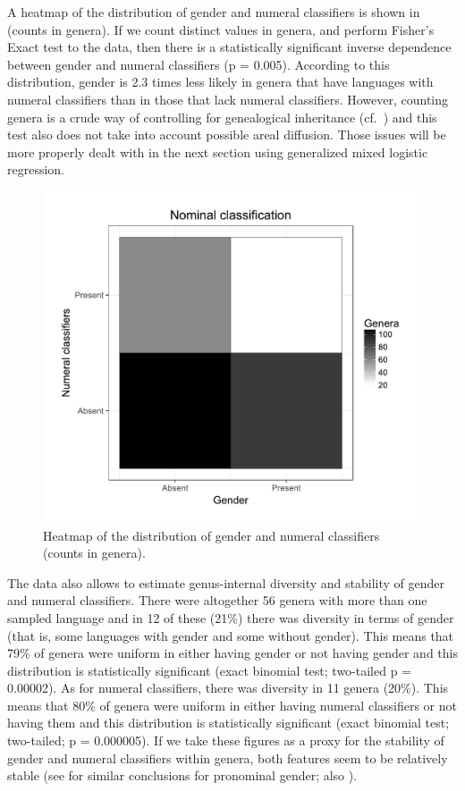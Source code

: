 \documentclass[output=collectionpaper]{langsci/langscibook}
\begin{document}
\newpage 
A heatmap of the distribution of gender and numeral classifiers is shown in  (counts in genera). If we count distinct values in genera, and perform Fisher's Exact test to the data, then there is a statistically significant inverse dependence between gender and numeral classifiers (p = 0.005). According to this distribution, gender is 2.3 times less likely in genera that have languages with numeral classifiers than in those that lack numeral classifiers. However, counting genera is a crude way of controlling for genealogical inheritance (cf.\ ) and this test also does not take into account possible areal diffusion. Those issues will be more properly dealt with in the next section using generalized mixed logistic regression.

\begin{figure}
\includegraphics[width=.6\textwidth]{figures/13/Fig3_heatmap}
\caption{%
Heatmap of the distribution of gender and numeral classifiers (counts in genera).
}%
\label{fig:Sinne:3}
\end{figure}

The data also allows to estimate genus-internal diversity and stability of gender and numeral classifiers. There were altogether 56 genera with more than one sampled language and in 12 of these (21\%) there was diversity in terms of gender (that is, some languages with gender and some without gender). This means that 79\% of genera were uniform in either having gender or not having gender and this distribution is statistically significant (exact binomial test; two-tailed p = 0.00002). As for numeral classifiers, there was diversity in 11 genera (20\%). This means that 80\% of genera were uniform in either having numeral classifiers or not having them and this distribution is statistically significant (exact binomial test; two-tailed; p = 0.000005). If we take these figures as a proxy for the stability of gender and numeral classifiers within genera, both features seem to be relatively stable (see \citealt[433--434]{Bickel2013b} for similar conclusions for pronominal gender; also \citealt[196--202]{Dahl2004}).
\end{document}
